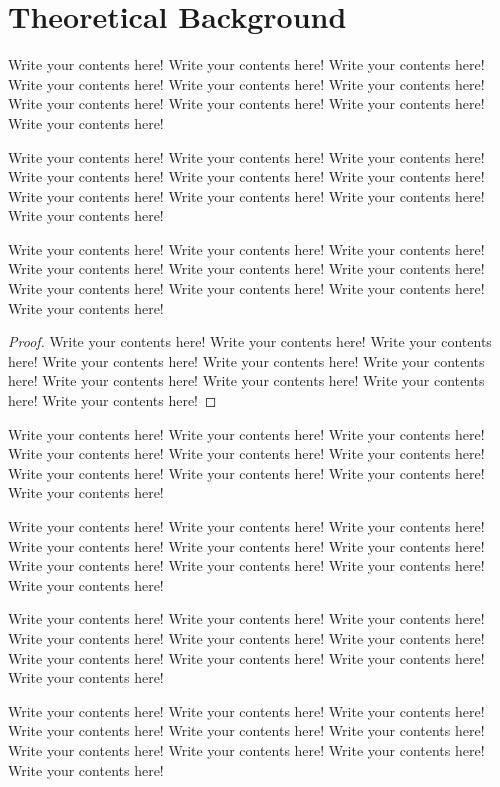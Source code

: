\documentclass[12pt,a4paper]{ruppmath}
\begin{document}
\chapter{Theoretical Background}
Write your contents here! Write your contents here! Write your contents here! Write your contents here! Write your contents here! Write your contents here! Write your contents here! Write your contents here! Write your contents here! Write your contents here! 
\begin{definition}
	Write your contents here! Write your contents here! Write your contents here! Write your contents here! Write your contents here! Write your contents here! Write your contents here! Write your contents here! Write your contents here! Write your contents here! 
\end{definition}
\begin{lemma}
	Write your contents here! Write your contents here! Write your contents here! Write your contents here! Write your contents here! Write your contents here! Write your contents here! Write your contents here! Write your contents here! Write your contents here! 
\end{lemma}
\begin{proof}
	Write your contents here! Write your contents here! Write your contents here! Write your contents here! Write your contents here! Write your contents here! Write your contents here! Write your contents here! Write your contents here! Write your contents here! 
\end{proof}
\begin{theorem}
	Write your contents here! Write your contents here! Write your contents here! Write your contents here! Write your contents here! Write your contents here! Write your contents here! Write your contents here! Write your contents here! Write your contents here! 
\end{theorem}
\begin{sketchofproof}
	Write your contents here! Write your contents here! Write your contents here! Write your contents here! Write your contents here! Write your contents here! Write your contents here! Write your contents here! Write your contents here! Write your contents here! 
\end{sketchofproof}
\begin{corollary}
	Write your contents here! Write your contents here! Write your contents here! Write your contents here! Write your contents here! Write your contents here! Write your contents here! Write your contents here! Write your contents here! Write your contents here! 
\end{corollary}
\begin{remark}
	Write your contents here! Write your contents here! Write your contents here! Write your contents here! Write your contents here! Write your contents here! Write your contents here! Write your contents here! Write your contents here! Write your contents here! 
\end{remark}
\end{document}
